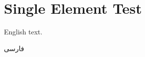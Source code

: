 \documentclass[12pt,a4paper]{article}
\begin{document}
\section*{Single Element Test}

English text.

\textfarsi{فارسی}
\end{document}
